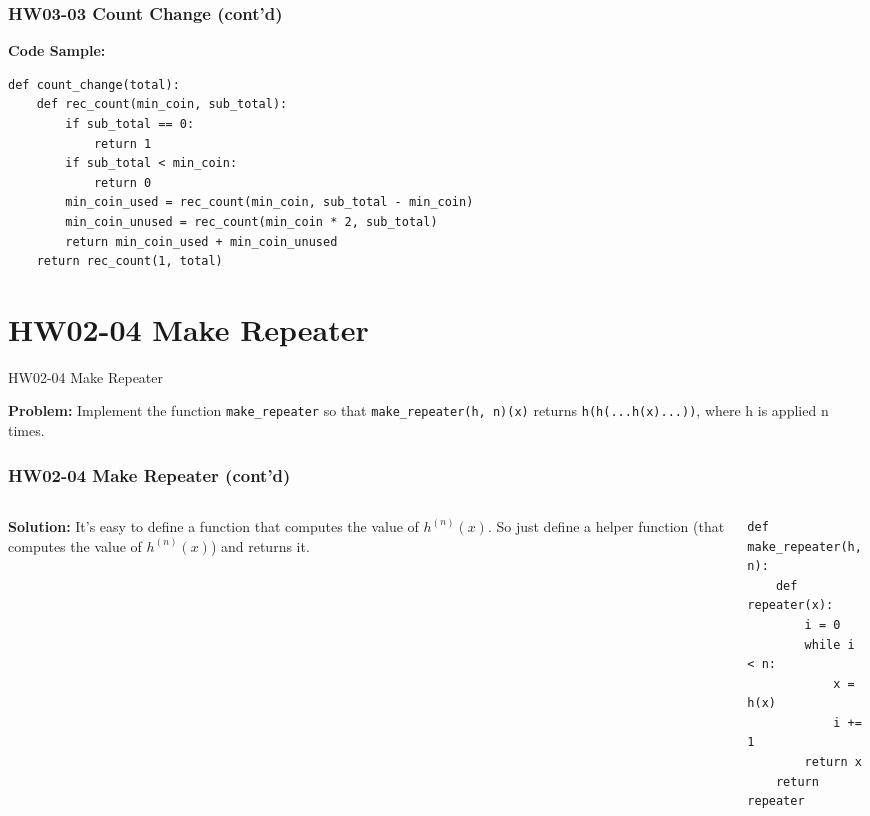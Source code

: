 \documentclass[aspectratio=169]{beamer}
\begin{document}
\begin{frame}[fragile]
\frametitle{{HW03-03 Count Change (cont'd)}}
    
\textbf{Code Sample:} 
\begin{verbatim}
def count_change(total):
    def rec_count(min_coin, sub_total):
        if sub_total == 0:
            return 1
        if sub_total < min_coin:
            return 0
        min_coin_used = rec_count(min_coin, sub_total - min_coin)
        min_coin_unused = rec_count(min_coin * 2, sub_total)
        return min_coin_used + min_coin_unused
    return rec_count(1, total)
\end{verbatim}
    
\end{frame}

\section{HW02-04 Make Repeater}
\begin{frame}{HW02-04 Make Repeater}

\textbf{Problem:} Implement the function \texttt{make_repeater} so that \texttt{make_repeater(h, n)(x)} returns \texttt{h(h(...h(x)...))}, where h is applied n times.


\end{frame}

\begin{frame}[fragile]
\frametitle{{HW02-04 Make Repeater (cont'd)}}

\begin{columns}
\begin{column}{0.5\textwidth}
\textbf{Solution:} It's easy to define a function that computes the value of $h^{(n)}(x)$. So just define a helper function (that computes the value of $h^{(n)}(x)$) and returns it.
\end{column}

\begin{column}{0.5\textwidth}  
\begin{verbatim}
def make_repeater(h, n):
    def repeater(x):
        i = 0
        while i < n:
            x = h(x)
            i += 1
        return x
    return repeater
\end{verbatim}
\end{column}
\end{columns}

\end{frame}
\end{document}
